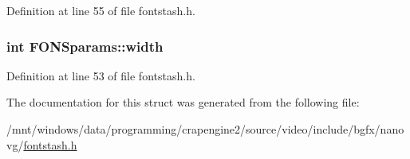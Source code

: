Definition at line 55 of file fontstash.\+h.

\hypertarget{struct_f_o_n_sparams_aac83f900d8d0d99db419facda30dd9d2}{
\subsubsection[{width}]{\setlength{\rightskip}{0pt plus 5cm}int F\+O\+N\+Sparams\+::width}}\label{struct_f_o_n_sparams_aac83f900d8d0d99db419facda30dd9d2}


Definition at line 53 of file fontstash.\+h.



The documentation for this struct was generated from the following file\+:\begin{DoxyCompactItemize}
\item 
/mnt/windows/data/programming/crapengine2/source/video/include/bgfx/nanovg/\hyperlink{fontstash_8h}{fontstash.\+h}\end{DoxyCompactItemize}
